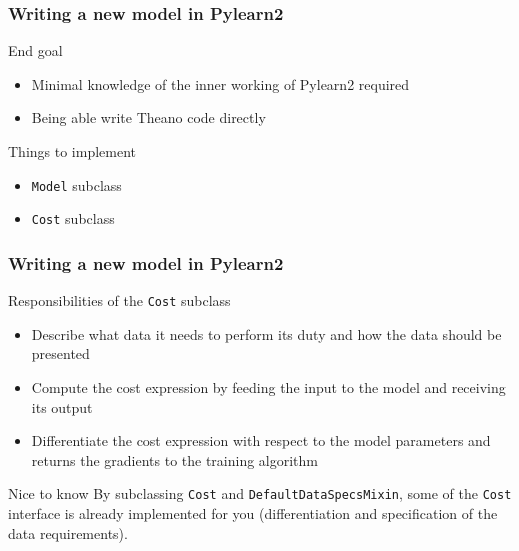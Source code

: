 \documentclass[mathserif, xcolor=dvipsnames]{beamer}
\begin{document}
\begin{frame}[fragile]
    \frametitle{Writing a new model in Pylearn2}
    \begin{block}{End goal}
    \begin{itemize}
        \item{Minimal knowledge of the inner working of Pylearn2 required}
        \item{Being able write Theano code directly}
    \end{itemize}
    \end{block}

    \begin{block}{Things to implement}
    \begin{itemize}
        \item{\texttt{Model} subclass}
        \item{\texttt{Cost} subclass}
    \end{itemize}
    \end{block}

\end{frame}

\begin{frame}[fragile]
    \frametitle{Writing a new model in Pylearn2}
    \begin{block}{Responsibilities of the \texttt{Cost} subclass}
    \begin{itemize}
        \item{Describe what data it needs to perform its duty and how the data
              should be presented}
        \item{Compute the cost expression by feeding the input to the model
              and receiving its output}
        \item{Differentiate the cost expression with respect to the model
              parameters and returns the gradients to the training algorithm}
    \end{itemize}
    \end{block}

    \begin{alertblock}{Nice to know}
    By subclassing \texttt{Cost} and \texttt{DefaultDataSpecsMixin}, some of the
    \texttt{Cost} interface is already implemented for you (differentiation
    and specification of the data requirements).
    \end{alertblock}
\end{frame}
\end{document}
